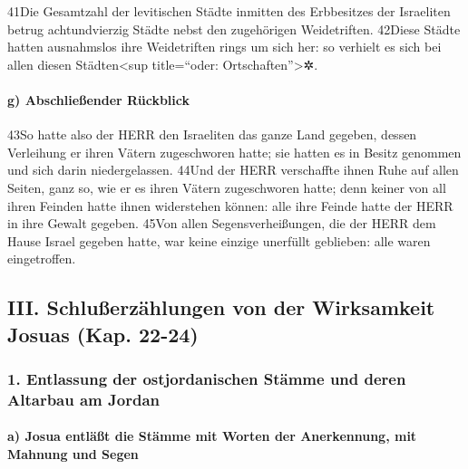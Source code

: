 41Die Gesamtzahl der levitischen Städte inmitten des Erbbesitzes der
Israeliten betrug achtundvierzig Städte nebst den zugehörigen
Weidetriften. 42Diese Städte hatten ausnahmslos ihre Weidetriften rings
um sich her: so verhielt es sich bei allen diesen Städten\textless sup
title=``oder: Ortschaften''\textgreater✲.

\hypertarget{g-abschlieuxdfender-ruxfcckblick}{%
\paragraph{g) Abschließender
Rückblick}\label{g-abschlieuxdfender-ruxfcckblick}}

43So hatte also der HERR den Israeliten das ganze Land gegeben, dessen
Verleihung er ihren Vätern zugeschworen hatte; sie hatten es in Besitz
genommen und sich darin niedergelassen. 44Und der HERR verschaffte ihnen
Ruhe auf allen Seiten, ganz so, wie er es ihren Vätern zugeschworen
hatte; denn keiner von all ihren Feinden hatte ihnen widerstehen können:
alle ihre Feinde hatte der HERR in ihre Gewalt gegeben. 45Von allen
Segensverheißungen, die der HERR dem Hause Israel gegeben hatte, war
keine einzige unerfüllt geblieben: alle waren eingetroffen.

\hypertarget{iii.-schluuxdferzuxe4hlungen-von-der-wirksamkeit-josuas-kap.-22-24}{%
\subsection{III. Schlußerzählungen von der Wirksamkeit Josuas (Kap.
22-24)}\label{iii.-schluuxdferzuxe4hlungen-von-der-wirksamkeit-josuas-kap.-22-24}}

\hypertarget{entlassung-der-ostjordanischen-stuxe4mme-und-deren-altarbau-am-jordan}{%
\subsubsection{1. Entlassung der ostjordanischen Stämme und deren
Altarbau am
Jordan}\label{entlassung-der-ostjordanischen-stuxe4mme-und-deren-altarbau-am-jordan}}

\hypertarget{a-josua-entluxe4uxdft-die-stuxe4mme-mit-worten-der-anerkennung-mit-mahnung-und-segen}{%
\paragraph{a) Josua entläßt die Stämme mit Worten der Anerkennung, mit
Mahnung und
Segen}\label{a-josua-entluxe4uxdft-die-stuxe4mme-mit-worten-der-anerkennung-mit-mahnung-und-segen}}

